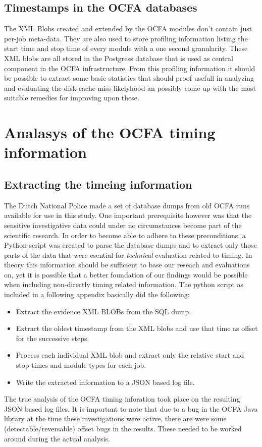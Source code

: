 \subsection{Timestamps in the OCFA databases}
The XML Blobs created and extended by the OCFA modules don't contain just per-job meta-data. They are also used to store profiling information listing the start time and stop time of every module with a one second granularity.  These XML blobs are all stored in the Postgress database that is used as central component in the OCFA infrastructure. From this profiling information it should be possible to extract some basic statistics that should proof usefull in analyzing and evaluating the disk-cache-miss likelyhood an possibly come up with the most suitable remedies for improving upon these.
\section{Analasys of the OCFA timing information}
\subsection{Extracting the timeing information}
The Dutch National Police made a set of database dumps from old OCFA runs available for use in this study. One important prerequisite however was that the sensitive investigative data could under no circumstances become part of the scientific research. In order to become able to adhere to these preconditions, a Python script was created to parse the database dumps and to extract only those parts of the data that were esential for \emph{technical} evaluation related to timing. In theory this information should be sufficient to base our reseach and evaluations on, yet it is possible that a better foundation of our findings would be possible when including non-directly timing related information. The python script as included in a following appendix basically did the following:
\begin{itemize}
\item Extract the evidence XML BLOBs from the SQL dump.
\item Extract the oldest timestamp from the XML blobs and use that time as offset for the successive steps.
\item Process each individual XML blob and extract only the relative start and stop times and module types for each job.
\item Write the extracted information to a JSON based log file.
\end{itemize}
The true analysis of the OCFA timing inforation took place on the resulting JSON based log files. It is important to note that due to a bug in the OCFA Java library at the time these investigations were active, there are were some (detectable/reversable) offset bugs in the results. These needed to be worked around during the actual analysis.




